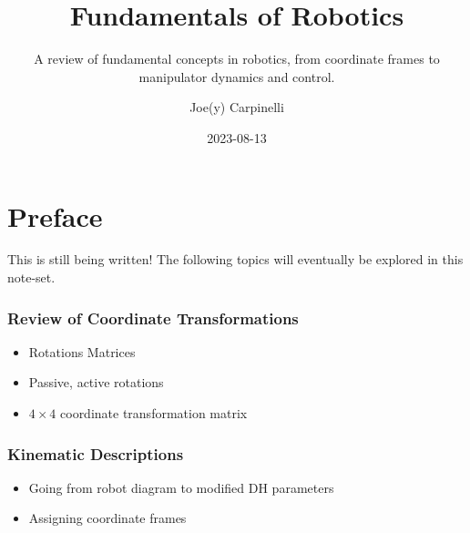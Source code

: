 \documentclass[
  letterpaper,
  DIV=11,
  numbers=noendperiod]{scrreprt}
\title{Fundamentals of Robotics}
\subtitle{A review of fundamental concepts in robotics, from coordinate
frames to manipulator dynamics and control.}
\author{Joe(y) Carpinelli}
\date{2023-08-13}
\providecommand{\tightlist}{%
  \setlength{\itemsep}{0pt}\setlength{\parskip}{0pt}}\usepackage{longtable,booktabs,array}
\renewcommand*\contentsname{Table of contents}
\newcommand\contentsname{Table of contents}
\begin{document}
\maketitle
\ifdefined\Shaded\renewenvironment{Shaded}{\begin{tcolorbox}[boxrule=0pt, interior hidden, frame hidden, sharp corners, enhanced, borderline west={3pt}{0pt}{shadecolor}, breakable]}{\end{tcolorbox}}\fi

\renewcommand*\contentsname{Table of contents}
{
\hypersetup{linkcolor=}
\setcounter{tocdepth}{2}
\tableofcontents
}

\hypertarget{preface}{%
\chapter*{Preface}\label{preface}}


This is still being written! The following topics will eventually be
explored in this note-set.

\hypertarget{review-of-coordinate-transformations}{%
\subsection*{Review of Coordinate
Transformations}\label{review-of-coordinate-transformations}}

\begin{itemize}
\tightlist
\item
  Rotations Matrices
\item
  Passive, active rotations
\item
  \(4\times4\) coordinate transformation matrix
\end{itemize}

\hypertarget{kinematic-descriptions}{%
\subsection*{Kinematic Descriptions}\label{kinematic-descriptions}}

\begin{itemize}
\tightlist
\item
  Going from robot diagram to modified DH parameters
\item
  Assigning coordinate frames
\end{itemize}
\end{document}
